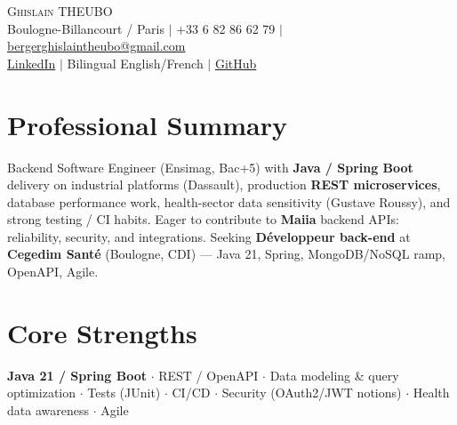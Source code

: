 \documentclass[letterpaper,10.5pt]{article}
\begin{document}
\begin{center}
{\Huge \scshape Ghislain THEUBO} \\ \vspace{2pt}
\small Boulogne-Billancourt / Paris $|$ +33 6 82 86 62 79 $|$ \href{mailto:bergerghislaintheubo@gmail.com}{bergerghislaintheubo@gmail.com} \\
\href{https://www.linkedin.com/in/berger-ghislain}{LinkedIn} $|$ Bilingual English/French $|$ \href{https://github.com/Bergerghislain}{GitHub}
\end{center}
\vspace{-6pt}
\section{Professional Summary}
\small{Backend Software Engineer (Ensimag, Bac+5) with \textbf{Java / Spring Boot} delivery on industrial platforms (Dassault), production \textbf{REST microservices}, database performance work, health-sector data sensitivity (Gustave Roussy), and strong testing / CI habits. Eager to contribute to \textbf{Maiia} backend APIs: reliability, security, and integrations. Seeking \textbf{D\'eveloppeur back-end} at \textbf{Cegedim Sant\'e} (Boulogne, CDI) --- Java 21, Spring, MongoDB/NoSQL ramp, OpenAPI, Agile.}
\section{Core Strengths}
\small{\textbf{Java 21 / Spring Boot} $\cdot$ REST / OpenAPI $\cdot$ Data modeling \& query optimization $\cdot$ Tests (JUnit) $\cdot$ CI/CD $\cdot$ Security (OAuth2/JWT notions) $\cdot$ Health data awareness $\cdot$ Agile}
\end{document}
